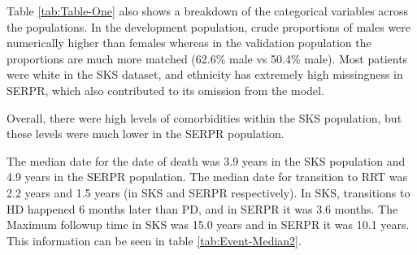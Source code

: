 \documentclass[
]{article}
\begin{document}
Table \ref{tab:Table-One} also shows a breakdown of the categorical variables across the populations. In the development population, crude proportions of males were numerically higher than females whereas in the validation population the proportions are much more matched (62.6\% male vs 50.4\% male). Most patients were white in the SKS dataset, and ethnicity has extremely high missingness in SERPR, which also contributed to its omission from the model.

Overall, there were high levels of comorbidities within the SKS population, but these levels were much lower in the SERPR population.

The median date for the date of death was 3.9 years in the SKS population and 4.9 years in the SERPR population. The median date for transition to RRT was 2.2 years and 1.5 years (in SKS and SERPR respectively). In SKS, transitions to HD happened 6 months later than PD, and in SERPR it was 3.6 months. The Maximum followup time in SKS was 15.0 years and in SERPR it was 10.1 years. This information can be seen in table \ref{tab:Event-Median2}.
\end{document}
